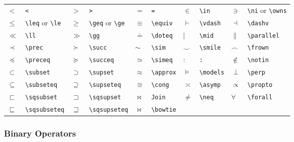 \documentclass[10pt, english]{article}
\begin{document}
	\begin{center}
		\scriptsize
	\begin{tabular}{ll|ll|ll|ll|ll}
		$<$ & \verb|<| & $>$ & \verb|>| & $=$ & \verb|=| & $\in$ & \verb|\in| & $\ni$ & \verb|\ni| or \verb|\owns| \\
		$\le$ & \verb|\leq| or \verb|\le| & $\ge$ & \verb|\geq| or \verb|\ge| & $\equiv$ & \verb|\equiv| & $\vdash$ & \verb|\vdash| & $\dashv$ & \verb|\dashv| \\
		$\ll$ & \verb|\ll| & $\gg$ & \verb|\gg| & $\doteq$ & \verb|\doteq| & $\mid$ & \verb|\mid| & $\parallel$ & \verb|\parallel| \\
		$\prec$ & \verb|\prec| & $\succ$ & \verb|\succ| & $\sim$ & \verb|\sim| & $\smile$ & \verb|\smile| & $\frown$ & \verb|\frown| \\
		$\preceq$ & \verb|\preceq| & $\succeq$ & \verb|\succeq| & $\simeq$ & \verb|\simeq| & $:$ & \verb|:| & $\notin$ & \verb|\notin| \\
		$\subset$ & \verb|\subset| & $\supset$ & \verb|\supset| & $\approx$ & \verb|\approx| & $\models$ & \verb|\models| & $\perp$ & \verb|\perp| \\
		$\subseteq$ & \verb|\subseteq| & $\supseteq$ & \verb|\supseteq| & $\cong$ & \verb|\cong| & $\asymp$ & \verb|\asymp| & $\propto$ & \verb|\propto| \\
		$\sqsubset$ & \verb|\sqsubset| & $\sqsupset$ & \verb|\sqsupset| & $\Join$ & \verb|Join| & $\neq$ & \verb|\neq| & $\forall$ & \verb|\forall| \\
		$\sqsubseteq$ & \verb|\sqsubseteq| & $\sqsupseteq$ & \verb|\sqsupseteq| & $\bowtie$ & \verb|\bowtie| \\
	\end{tabular}
	\end{center}

\subsubsection*{Binary Operators}
\end{document}
